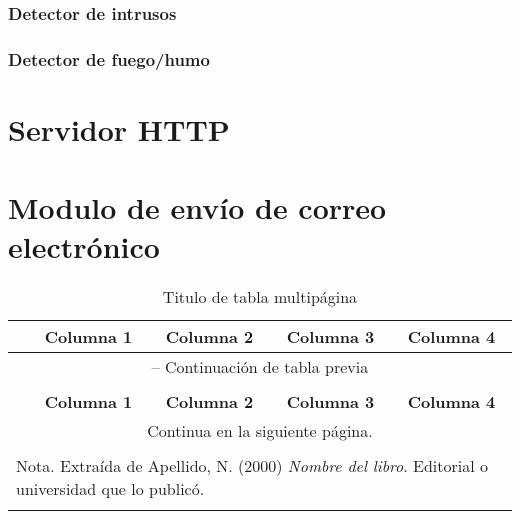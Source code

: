 \subsubsection{Detector de intrusos}
\subsubsection{Detector de fuego/humo}
\section{Servidor HTTP}
\section{Modulo de envío de correo electrónico}

\begin{longtable}{p{2cm}|p{3cm}|p{3cm}|p{3cm}|p{3cm}|}
    \caption{Titulo de tabla multipágina} \label{tabla:tabla_largo_ejemplo} \\
    \cline{2-5}
    \multicolumn{1}{l|}{} & \multicolumn{1}{c|}{\textbf{Columna 1}} & \multicolumn{1}{c|}{\textbf{Columna 2}} & \multicolumn{1}{c|}{\textbf{Columna 3}} & \multicolumn{1}{c|}{\textbf{Columna 4}}\\ \hline
    \endfirsthead

    \multicolumn{5}{c}{{\tablename{} \thetable{} -- Continuación de tabla previa}} \\
    \multicolumn{5}{l}{} \\
    \cline{2-5}
    \multicolumn{1}{l|}{} & \multicolumn{1}{c|}{\textbf{Columna 1}} & \multicolumn{1}{c|}{\textbf{Columna 2}} & \multicolumn{1}{c|}{\textbf{Columna 3}} & \multicolumn{1}{c|}{\textbf{Columna 4}}\\ \hline
    \endhead

    \multicolumn{5}{c}{{Continua en la siguiente página.}} \\
    \endfoot

    \multicolumn{5}{l}{} \\
    \multicolumn{5}{l}{Nota. Extraída de Apellido, N. (2000) \textit{Nombre del libro}. Editorial o universidad que lo publicó.} \\
    \endlastfoot


\end{longtable}
